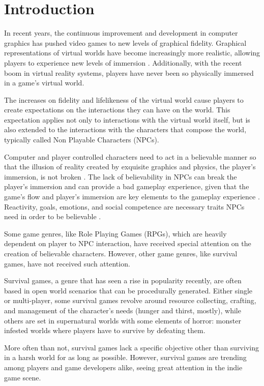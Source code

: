 \section{Introduction}

In recent years, the continuous improvement and development in computer graphics has pushed video games to new levels of graphical fidelity.
Graphical representations of virtual worlds have become increasingly more realistic, allowing players to experience new levels of immersion \cite{brown:immersion}.
Additionally, with the recent boom in virtual reality systems, players have never been so physically immersed in a game's virtual world.

The increases on fidelity and lifelikeness of the virtual world cause players to create expectations on the interactions they can have on the world.
This expectation applies not only to interactions with the virtual world itself, but is also extended to the interactions with the characters that compose the world, typically called Non Playable Characters (NPCs).

Computer and player controlled characters need to act in a believable manner so that the illusion of reality created by exquisite graphics and physics, the player's immersion, is not broken \cite{thrainsson:emotion-games}.
The lack of believability in NPCs can break the player's immersion and can provide a bad gameplay experience, given that the game's flow and player's immersion are key elements to the gameplay experience \cite{ijsselsteijn:userexperience}.
Reactivity, goals, emotions, and social competence are necessary traits NPCs need in order to be believable \cite{bates:emotioninagents}.

Some game genres, like Role Playing Games (RPGs), which are heavily dependent on player to NPC interaction, have received special attention on the creation of believable characters.
However, other game genres, like survival games, have not received such attention.

Survival games, a genre that has seen a rise in popularity recently, are often based in open world scenarios that can be procedurally generated.
Either single or multi-player, some survival games revolve around resource collecting, crafting, and management of the character's needs (hunger and thirst, mostly), while others are set in supernatural worlds with some elements of horror: monster infested worlds where players have to survive by defeating them.

More often than not, survival games lack a specific objective other than surviving in a harsh world for as long as possible.
However, survival games are trending among players and game developers alike, seeing great attention in the indie game scene.

